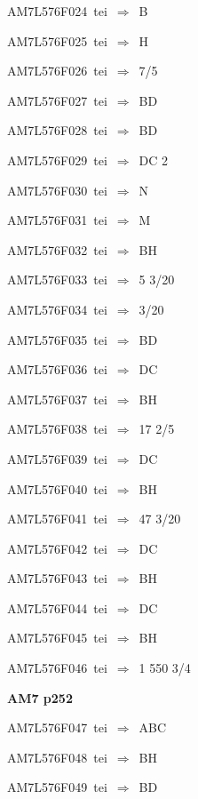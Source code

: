 {\sixrm AM7L576F024\ {\sixit tei}\ }$\Rightarrow$\ B\par\smallskip
{\sixrm AM7L576F025\ {\sixit tei}\ }$\Rightarrow$\ H\par\smallskip
{\sixrm AM7L576F026\ {\sixit tei}\ }$\Rightarrow$\ 7/5\par\smallskip
{\sixrm AM7L576F027\ {\sixit tei}\ }$\Rightarrow$\ BD\par\smallskip
{\sixrm AM7L576F028\ {\sixit tei}\ }$\Rightarrow$\ BD\par\smallskip
{\sixrm AM7L576F029\ {\sixit tei}\ }$\Rightarrow$\ DC 2\par\smallskip
{\sixrm AM7L576F030\ {\sixit tei}\ }$\Rightarrow$\ N\par\smallskip
{\sixrm AM7L576F031\ {\sixit tei}\ }$\Rightarrow$\ M\par\smallskip
{\sixrm AM7L576F032\ {\sixit tei}\ }$\Rightarrow$\ BH\par\smallskip
{\sixrm AM7L576F033\ {\sixit tei}\ }$\Rightarrow$\ 5 3/20\par\smallskip
{\sixrm AM7L576F034\ {\sixit tei}\ }$\Rightarrow$\ 3/20\par\smallskip
{\sixrm AM7L576F035\ {\sixit tei}\ }$\Rightarrow$\ BD\par\smallskip
{\sixrm AM7L576F036\ {\sixit tei}\ }$\Rightarrow$\ DC\par\smallskip
{\sixrm AM7L576F037\ {\sixit tei}\ }$\Rightarrow$\ BH\par\smallskip
{\sixrm AM7L576F038\ {\sixit tei}\ }$\Rightarrow$\ 17 2/5\par\smallskip
{\sixrm AM7L576F039\ {\sixit tei}\ }$\Rightarrow$\ DC\par\smallskip
{\sixrm AM7L576F040\ {\sixit tei}\ }$\Rightarrow$\ BH\par\smallskip
{\sixrm AM7L576F041\ {\sixit tei}\ }$\Rightarrow$\ 47 3/20\par\smallskip
{\sixrm AM7L576F042\ {\sixit tei}\ }$\Rightarrow$\ DC\par\smallskip
{\sixrm AM7L576F043\ {\sixit tei}\ }$\Rightarrow$\ BH\par\smallskip
{\sixrm AM7L576F044\ {\sixit tei}\ }$\Rightarrow$\ DC\par\smallskip
{\sixrm AM7L576F045\ {\sixit tei}\ }$\Rightarrow$\ BH\par\smallskip
{\sixrm AM7L576F046\ {\sixit tei}\ }$\Rightarrow$\ 1 550 3/4\par\smallskip

\par\vfill\eject
{\bf\hfill AM7 p252\hfill\hbox{}}\par\bigskip
{\sixrm AM7L576F047\ {\sixit tei}\ }$\Rightarrow$\ ABC\par\smallskip
{\sixrm AM7L576F048\ {\sixit tei}\ }$\Rightarrow$\ BH\par\smallskip
{\sixrm AM7L576F049\ {\sixit tei}\ }$\Rightarrow$\ BD\par\smallskip


